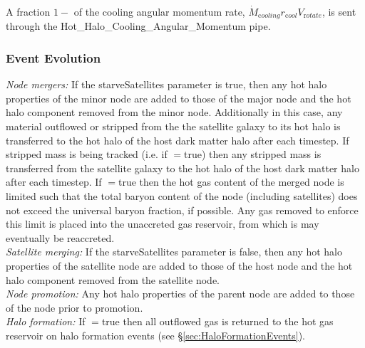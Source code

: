 A fraction $1-${\normalfont \ttfamily [hotHaloAngularMomentumLossFraction]} of the cooling angular momentum rate, $\dot{M}_{\mathrm cooling} r_{\mathrm cool} V_{\mathrm rotate}$, is sent through the {\normalfont \ttfamily Hot\_Halo\_Cooling\_Angular\_Momentum} pipe.

\subsubsection{Event Evolution}

\noindent\emph{Node mergers:} If the {\normalfont \ttfamily starveSatellites} parameter is true, then any hot halo properties of the minor \gls{node} are added to those of the major \gls{node} and the hot halo \gls{component} removed from the minor node. Additionally in this case, any material outflowed or stripped from the the satellite galaxy to its hot halo is transferred to the hot halo of the host dark matter halo after each timestep. If stripped mass is being tracked (i.e. if {\normalfont \ttfamily [hotHaloTrackStrippedGas]}$=${\normalfont \ttfamily true}) then any stripped mass is transferred from the satellite galaxy to the hot halo of the host dark matter halo after each timestep. If {\normalfont \ttfamily [hotHaloNodeMergerLimitBaryonFraction]}$=${\normalfont \ttfamily true} then the hot gas content of the merged node is limited such that the total baryon content of the node (including satellites) does not exceed the universal baryon fraction, if possible. Any gas removed to enforce this limit is placed into the unaccreted gas reservoir, from which is may eventually be reaccreted.\\

\noindent\emph{Satellite merging:} If the {\normalfont \ttfamily starveSatellites} parameter is false, then any hot halo properties of the satellite \gls{node} are added to those of the host \gls{node} and the hot halo \gls{component} removed from the satellite node.\\

\noindent\emph{Node promotion:} Any hot halo properties of the parent \gls{node} are added to those of the \gls{node} prior to promotion.\\

\noindent\emph{Halo formation:} If {\normalfont \ttfamily [hotHaloOutflowReturnOnFormation]}$=${\normalfont \ttfamily true} then all outflowed gas is returned to the hot gas reservoir on halo formation events (see \S\ref{sec:HaloFormationEvents}).\\


